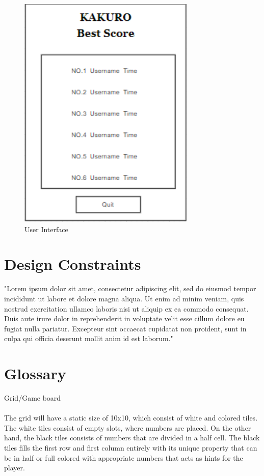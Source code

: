 \documentclass[12pt]{article}
\begin{document}
\begin{figure}[htbp]
          \includegraphics[scale=0.5]{images/UI4.png}
    \caption{User Interface}
    \label{fig:UI}
\end{figure}

\section{Design Constraints}
"Lorem ipsum dolor sit amet, consectetur adipiscing elit, sed do eiusmod tempor incididunt ut labore et dolore magna aliqua. Ut enim ad minim veniam, quis nostrud exercitation ullamco laboris nisi ut aliquip ex ea commodo consequat. Duis aute irure dolor in reprehenderit in voluptate velit esse cillum dolore eu fugiat nulla pariatur. Excepteur sint occaecat cupidatat non proident, sunt in culpa qui officia deserunt mollit anim id est laborum."

\section{Glossary}



Grid/Game board\\\\
The grid will have a static size of 10x10, which consist of white and colored tiles. The white tiles consist of empty slots, where numbers are placed. On the other hand, the black tiles consists of numbers that are divided in a half cell. The black tiles fills the first row and first column entirely with its unique property that can be in half or full colored with appropriate numbers that acts as hints for the player.\\
\end{document}
